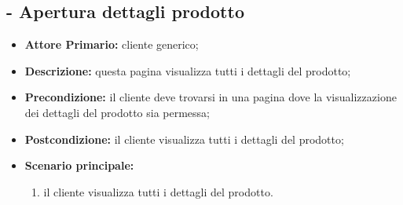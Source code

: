 \stepUserCase
\subsection{ - Apertura dettagli prodotto}
\begin{itemize}
    \item \textbf{Attore Primario:} cliente generico;
    \item \textbf{Descrizione:} questa pagina visualizza tutti i dettagli del prodotto;
    \item \textbf{Precondizione:} il cliente deve trovarsi in una pagina dove la visualizzazione dei dettagli del prodotto sia permessa;
    \item \textbf{Postcondizione:} il cliente visualizza tutti i dettagli del prodotto;
    \item \textbf{Scenario principale:}
          \begin{enumerate}
              \item il cliente visualizza tutti i dettagli del prodotto.
          \end{enumerate}
\end{itemize}

\stepUserCase
